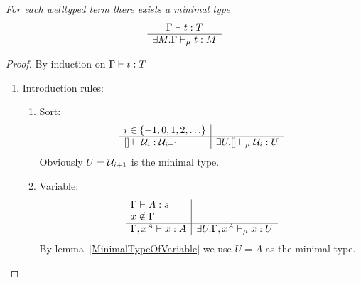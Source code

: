 \begin{theorem}
    \label{MinimalType}
    \emph{For each welltyped term there exists a minimal type}
    $$
    \begin{array}{c} 
        \Gamma \vdash t: T
     \\ \hline 
        \exists M. \Gamma \vdash_\mu t: M
    \end{array}
    $$

    \begin{proof} By induction on $\Gamma \vdash t: T$
        \begin{enumerate}
            \item Introduction rules:
            \begin{enumerate}
                \item Sort:
                    $$
                    \begin{array}{l|l}
                        i \in {\{-1, 0, 1, 2, \ldots\}}
                        \\
                        \hline
                        [] \vdash {\cal U}_i : {\cal U}_{i+1}
                        &
                        \exists U. [] \vdash_\mu {\cal U}_i: U
                    \end{array}
                    $$
                    Obviously $U = {\cal U}_{i+1}$ is the minimal type.

                \item Variable:
                    $$
                    \begin{array}{l|l}
                        \Gamma \vdash A : s
                        \\
                        x \notin \Gamma
                        \\
                        \hline
                        \Gamma, x^A \vdash x : A
                        &
                        \exists U. \Gamma, x^A \vdash_\mu x: U
                    \end{array}
                    $$
                    By lemma~\ref{MinimalTypeOfVariable} we use $U =A$ as the
                    minimal type.


\end{enumerate}
\end{enumerate}
\end{proof}
\end{theorem}
